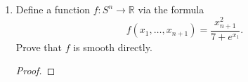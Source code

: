 \documentclass{article}
\begin{document}
\begin{enumerate}[label={\bf Q\arabic*:}]
  \item Define a function $f:S^n\rightarrow\mathbb{R}$ via the formula
    \begin{equation*}
      f(x_1,\ldots,x_{n+1}) = \frac{x_{n+1}^2}{7+e^{x_1}}.
    \end{equation*}
    Prove that $f$ is smooth directly.

    \begin{proof}
    \end{proof}
\end{enumerate}
\end{document}

